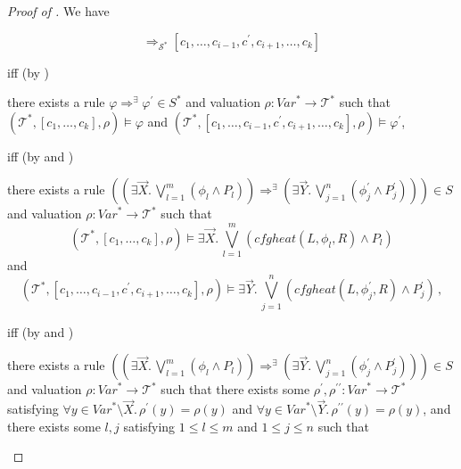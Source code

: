 \documentclass{article}
\newenvironment{proofenv}
  {
    \VerbatimEnvironment\begin{tcolorbox}[colback=black!0!white] %
  }
  {
   \end{tcolorbox}
  }
\begin{document}
\begin{proof}[Proof of ]
We have
\begin{proofenv}
\begin{equation*}
[c_1,\ldots,c_k] \Rightarrow_{\mathcal{S}^*} [c_1, \ldots, c_{i-1}, c^\prime, c_{i+1}, \ldots, c_k]    
\end{equation*}
\end{proofenv}
iff (by )
\begin{proofenv}
there exists a rule $\varphi \Rightarrow^\exists \varphi^\prime \in S^*$
and valuation $\rho : \mathit{Var}^* \to \mathcal{T}^*$ such that
$(\mathcal{T}^*, [c_1,\ldots,c_k], \rho) \vDash \varphi$
and $(\mathcal{T}^*, [c_1, \ldots, c_{i-1}, c^\prime, c_{i+1}, \ldots, c_k], \rho) \vDash \varphi^\prime$,
\end{proofenv}
iff (by
 and )
\begin{proofenv}
there exists a rule $((\exists \vec{X}.\, \bigvee_{l=1}^{m} (\phi_l \land P_l)) \Rightarrow^\exists (\exists \vec{Y}.\, \bigvee_{j=1}^{n} (\phi^\prime_j \land P^\prime_j))) \in S$
and valuation $\rho : \mathit{Var}^* \to \mathcal{T}^*$ such that
\begin{equation*}
    (\mathcal{T}^*, [c_1,\ldots,c_k], \rho) \vDash \exists \vec{X}.\, \bigvee_{l=1}^{m}(\mathit{cfgheat}(L, \phi_l, R) \land P_l)
\end{equation*}
and
\begin{equation*}
    (\mathcal{T}^*, [c_1, \ldots, c_{i-1}, c^\prime, c_{i+1}, \ldots, c_k], \rho) \vDash
    \exists \vec{Y}.\, \bigvee_{j=1}^{n}(\mathit{cfgheat}(L, \phi^\prime_j, R) \land P^\prime_j) \, ,
\end{equation*}
\end{proofenv}
iff (by  and )
\begin{proofenv}
there exists a rule $((\exists \vec{X}.\, \bigvee_{l=1}^{m} (\phi_l \land P_l)) \Rightarrow^\exists (\exists \vec{Y}.\, \bigvee_{j=1}^{n} (\phi^\prime_j \land P^\prime_j))) \in S$
and valuation $\rho : \mathit{Var}^* \to \mathcal{T}^*$ such that
there exists some $\rho^\prime,\rho^{\prime\prime} : \mathit{Var}^* \to \mathcal{T}^*$
satisfying $\forall y \in \mathit{Var}^* \setminus \vec{X}.\, \rho^\prime(y) = \rho(y)$
and $\forall y \in \mathit{Var}^* \setminus \vec{Y}.\, \rho^{\prime\prime}(y) = \rho(y)$,
and there exists some $l,j$ satisfying $1 \leq l \leq m$ and $1 \leq j \leq n$ such that

\end{proofenv}
\end{proof}
\end{document}
